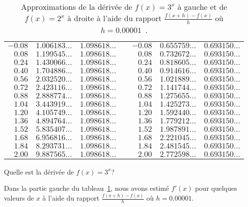 {\begin{table}[t]
{\begin{center}
\begin{tabular}{r|c|ccr|c|c}
$-0.08$ & $1.006183\ldots$ & $1.098618\ldots$ && $-0.08$ & $0.655759\ldots$ & $0.693150\ldots$ \\
$0.08$ & $1.199545\ldots$ & $1.098618\ldots$ && $0.08$ & $0.732672\ldots$ & $0.693150\ldots$ \\
$0.24$ & $1.430066\ldots$ & $1.098618\ldots$ && $0.24$ & $0.818605\ldots$ & $0.693150\ldots$ \\
$0.40$ & $1.704886\ldots$ & $1.098618\ldots$ && $0.40$ & $0.914616\ldots$ & $0.693150\ldots$ \\
$0.56$ & $2.032520\ldots$ & $1.098618\ldots$ && $0.56$ & $1.021889\ldots$ & $0.693150\ldots$ \\
$0.72$ & $2.423116\ldots$ & $1.098618\ldots$ && $0.72$ & $1.141744\ldots$ & $0.693150\ldots$ \\
$0.88$ & $2.888774\ldots$ & $1.098618\ldots$ && $0.88$ & $1.275655\ldots$ & $0.693150\ldots$ \\
$1.04$ & $3.443919\ldots$ & $1.098618\ldots$ && $1.04$ & $1.425273\ldots$ & $0.693150\ldots$ \\
$1.20$ & $4.105749\ldots$ & $1.098618\ldots$ && $1.20$ & $1.592440\ldots$ & $0.693150\ldots$ \\
$1.36$ & $4.894764\ldots$ & $1.098618\ldots$ && $1.36$ & $1.779212\ldots$ & $0.693150\ldots$ \\
$1.52$ & $5.835407\ldots$ & $1.098618\ldots$ && $1.52$ & $1.987891\ldots$ & $0.693150\ldots$ \\
$1.68$ & $6.956816\ldots$ & $1.098618\ldots$ && $1.68$ & $2.221045\ldots$ & $0.693150\ldots$ \\
$1.84$ & $8.293731\ldots$ & $1.098618\ldots$ && $1.84$ & $2.481545\ldots$ & $0.693150\ldots$ \\
$2.00$ & $9.887565\ldots$ & $1.098618\ldots$ && $2.00$ & $2.772598\ldots$ & $0.693150\ldots$ \\
\cline{1-3} \cline{5-7}
\end{tabular}
\end{center}
}
\caption[Approximations de la dérivée de $f(x) = 3^x$ et de $f(x) =2^x$ à
partir de la définition de la dérivées.]{Approximations de la dérivée
de $f(x) = 3^x$ à gauche et de $f(x) = 2^x$ à droite à l'aide du rapport
$\displaystyle \frac{f(x+h)-f(x)}{h}$ où $h = 0.00001$\ .\label{TAB_32_EXP}}
\end{table}

\begin{egg}
Quelle est la dérivée de $f(x) = 3^x$?

Dans la partie gauche du tableau~\ref{TAB_32_EXP}, nous avons
estimé $f'(x)$ pour quelques valeurs de $x$ à l'aide du rapport
$\displaystyle \frac{f(x+h)-f(x)}{h}$ où $h = 0.00001$.


\end{egg}}
